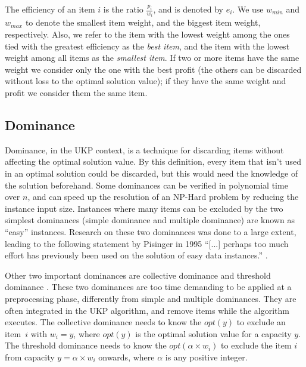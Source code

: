 \documentclass[runningheads,a4paper]{llncs}
\begin{document}
The efficiency of an item \(i\) is the ratio \(\frac{p_i}{w_i}\), and is denoted by \(e_i\). 
We use \(w_{min}\) and \(w_{max}\) to denote the smallest item weight, and the biggest item weight, respectively. 
Also, we refer to the item with the lowest weight among the ones tied with the greatest efficiency as the \emph{best item}, 
and the item with the lowest weight among all items as the \emph{smallest item}.
If two or more items have the same weight we consider only the one with the best profit (the others can be discarded without loss to the optimal solution value); if they have the same weight and profit we consider them the same item.


\subsection{Dominance}

Dominance, in the UKP context, is a technique for discarding items without affecting the optimal solution value. 
By this definition, every item that isn't used in an optimal solution could be discarded, but this would need the knowledge of the solution beforehand. 
Some dominances can be verified in polynomial time over \(n\), and can speed up the resolution of an NP-Hard problem by reducing the instance input size. 
Instances where many items can be excluded by the two simplest dominances (simple dominance and multiple dominance) are known as ``easy'' instances. 
Research on these two dominances was done to a large extent, leading to the following statement by Pisinger in 1995
``[...] perhaps too much effort has previously been used on the solution of easy data instances.'' \cite[p. 20]{pisinger1995}.

Other two important dominances are collective dominance and threshold dominance \cite{pya}. 
These two dominances are too time demanding to be applied at a preprocessing phase, differently from simple and multiple dominances. 
They are often integrated in the UKP algorithm, and remove items while the algorithm executes. 
The collective dominance needs to know the \(opt(y)\) to exclude an item~\(i\) with \(w_i = y\), where \(opt(y)\) is the optimal solution value for a capacity \(y\).
The threshold dominance needs to know the \(opt(\alpha\times w_i)\) to exclude the item \(i\) from capacity \(y = \alpha\times w_i\) onwards, where \(\alpha\) is any positive integer.
\end{document}
